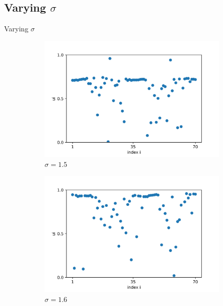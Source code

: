 \documentclass{beamer}
\begin{document}
\subsection{Varying $\sigma$}
\begin{frame}{Varying $\sigma$} \pause
\begin{figure}[H]
\begin{subfigure}{.32\textwidth}
  \centering
  \includegraphics[width=1\linewidth]{u_sigma=1.5.png}  
  \caption{$\sigma = 1.5$}
\end{subfigure}
\hfill
\begin{subfigure}{.32\textwidth}
  \centering
  \includegraphics[width=1\linewidth]{u_sigma=1.6.png}  
  \caption{$\sigma = 1.6$}
\end{subfigure}
\hfill
\begin{subfigure}{.32\textwidth}
  \centering

\end{subfigure}
\end{figure}
\end{frame}
\end{document}
